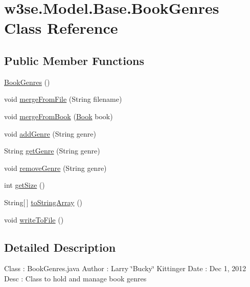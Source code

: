 \hypertarget{classw3se_1_1_model_1_1_base_1_1_book_genres}{\section{w3se.\-Model.\-Base.\-Book\-Genres Class Reference}
\label{classw3se_1_1_model_1_1_base_1_1_book_genres}
}
\subsection*{Public Member Functions}
\begin{DoxyCompactItemize}
\item 
\hyperlink{classw3se_1_1_model_1_1_base_1_1_book_genres_a7f8dbebc602beabb46ef1080e5a03924}{Book\-Genres} ()
\item 
void \hyperlink{classw3se_1_1_model_1_1_base_1_1_book_genres_a1fe134cd7f9b6cf016626858f4ea7baa}{merge\-From\-File} (String filename)
\item 
void \hyperlink{classw3se_1_1_model_1_1_base_1_1_book_genres_a5ac451e4a55ad25a414f7b424d4f2d3e}{merge\-From\-Book} (\hyperlink{classw3se_1_1_model_1_1_base_1_1_book}{Book} book)
\item 
void \hyperlink{classw3se_1_1_model_1_1_base_1_1_book_genres_aee5a8a3ea3a3d615c3934bc9e644e66f}{add\-Genre} (String genre)
\item 
String \hyperlink{classw3se_1_1_model_1_1_base_1_1_book_genres_a5ab2a24bf3fe141ed64b10291870b587}{get\-Genre} (String genre)
\item 
void \hyperlink{classw3se_1_1_model_1_1_base_1_1_book_genres_ae518d8eaa21728d3e2f43c359e2da7fe}{remove\-Genre} (String genre)
\item 
int \hyperlink{classw3se_1_1_model_1_1_base_1_1_book_genres_a14930f36a2a0b035069aefb032e36fd8}{get\-Size} ()
\item 
String\mbox{[}$\,$\mbox{]} \hyperlink{classw3se_1_1_model_1_1_base_1_1_book_genres_a03d2d53aa729f48e287a3f893bd66808}{to\-String\-Array} ()
\item 
void \hyperlink{classw3se_1_1_model_1_1_base_1_1_book_genres_a1ac4a35175cd19328224b6ccef616c86}{write\-To\-File} ()
\end{DoxyCompactItemize}


\subsection{Detailed Description}
Class \-: Book\-Genres.\-java Author \-: Larry \char`\"{}\-Bucky\char`\"{} Kittinger Date \-: Dec 1, 2012 Desc \-: Class to hold and manage book genres 

